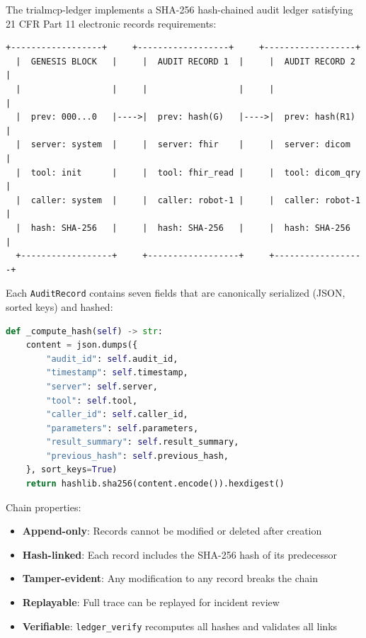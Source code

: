 \documentclass[10pt,letterpaper]{article}
\begin{document}
The trialmcp-ledger implements a SHA-256 hash-chained audit ledger satisfying 21 CFR Part 11 electronic records requirements:

\begin{lstlisting}[title={\textbf{Audit Hash Chain Structure}}]
  +------------------+     +------------------+     +------------------+
  |  GENESIS BLOCK   |     |  AUDIT RECORD 1  |     |  AUDIT RECORD 2  |
  |                  |     |                  |     |                  |
  |  prev: 000...0   |---->|  prev: hash(G)   |---->|  prev: hash(R1)  |
  |  server: system  |     |  server: fhir    |     |  server: dicom   |
  |  tool: init      |     |  tool: fhir_read |     |  tool: dicom_qry |
  |  caller: system  |     |  caller: robot-1 |     |  caller: robot-1 |
  |  hash: SHA-256   |     |  hash: SHA-256   |     |  hash: SHA-256   |
  +------------------+     +------------------+     +------------------+
\end{lstlisting}

Each \texttt{AuditRecord} contains seven fields that are canonically serialized (JSON, sorted keys) and hashed:

\begin{lstlisting}[language=Python,title={\textbf{Audit Record Hash Computation (v0.2.0)}}]
def _compute_hash(self) -> str:
    content = json.dumps({
        "audit_id": self.audit_id,
        "timestamp": self.timestamp,
        "server": self.server,
        "tool": self.tool,
        "caller_id": self.caller_id,
        "parameters": self.parameters,
        "result_summary": self.result_summary,
        "previous_hash": self.previous_hash,
    }, sort_keys=True)
    return hashlib.sha256(content.encode()).hexdigest()
\end{lstlisting}

Chain properties:
\begin{itemize}[leftmargin=2em]
    \item \textbf{Append-only}: Records cannot be modified or deleted after creation
    \item \textbf{Hash-linked}: Each record includes the SHA-256 hash of its predecessor
    \item \textbf{Tamper-evident}: Any modification to any record breaks the chain
    \item \textbf{Replayable}: Full trace can be replayed for incident review
    \item \textbf{Verifiable}: \texttt{ledger\_verify} recomputes all hashes and validates all links
\end{itemize}
\end{document}
